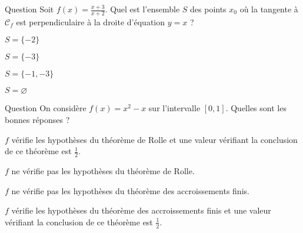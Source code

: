 \begin{multi}[multiple,feedback=
{La pente de la droite \(y=x\) est \(1\), donc la tangente à \(\mathcal{C}_f\) en \(x_0\) est perpendiculaire à cette droite si, et seulement si, \(f'(x_0)=-1\). C'est-à-dire \(x_0=-1\) ou \(x_0=-3\).
}]{Question}
Soit \(\displaystyle f(x)=\frac{x+3}{x+2}\). Quel est l'ensemble \(S\) des points \(x_0\) où la tangente à \(\mathcal{C}_f\) est perpendiculaire à la droite d'équation \(y=x\) ?

    \item \(S=\{-2\}\)
    \item \(S=\{-3\}\)
    \item* \(S=\{-1,-3\}\)
    \item \(S=\varnothing\)
\end{multi}


\begin{multi}{Question}
On considère \(\displaystyle f(x)=x^2-x\) sur l'intervalle \([0,1]\). Quelles sont les bonnes réponses ?

    \item* \(f\) vérifie les hypothèses du théorème de Rolle et une valeur vérifiant la conclusion de ce théorème est \(\displaystyle \frac{1}{2}\).
    \item \(f\) ne vérifie pas les hypothèses du théorème de Rolle.
    \item \(f\) ne vérifie pas les hypothèses du théorème des accroissements finis.
    \item* \(f\) vérifie les hypothèses du théorème des accroissements finis et une valeur vérifiant la conclusion de ce théorème est \(\displaystyle \frac{1}{2}\).
\end{multi}


